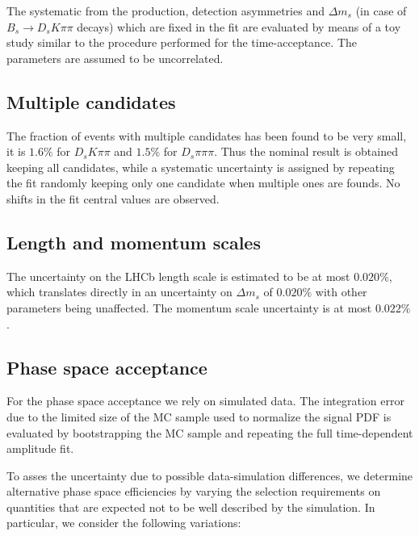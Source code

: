 The systematic from the production, detection asymmetries and $\Delta m_s$ (in case of  $B_s \to D_s K \pi\pi$ decays) which are fixed in the fit
are evaluated by means of a toy study similar to the procedure performed for the time-acceptance. The parameters are assumed to be uncorrelated.

\subsection{Multiple candidates}

The fraction of events with multiple candidates has been found to be very small, it is $1.6\%$ for $D_s K \pi\pi$ and $1.5\%$ for $D_s \pi \pi\pi$. 
Thus the nominal result is obtained keeping all candidates, while a systematic uncertainty is assigned
by repeating the fit randomly keeping only one candidate when multiple ones are founds.
No shifts in the fit central values are observed.

\subsection{Length and momentum scales}
The uncertainty on the LHCb length scale is estimated to be at most $0.020\%$\cite{LHCb-ANA-2012-053}, which translates
directly in an uncertainty on $\Delta m_s$ of $0.020\%$ with other parameters being unaffected.
The momentum scale uncertainty is at most $0.022\%$.


\subsection{Phase space acceptance}

For the phase space acceptance we rely on simulated data.
The integration error due to the limited size of the MC sample 
used to normalize the signal PDF is evaluated by bootstrapping the MC sample and repeating the full time-dependent amplitude fit.

To asses the uncertainty due to possible data-simulation differences, we determine
alternative phase space efficiencies by varying the selection requirements on quantities that
are expected not to be well described by the simulation. 
In particular, we consider the following variations:


